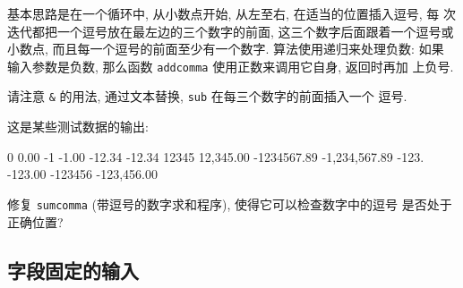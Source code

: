基本思路是在一个循环中, 从小数点开始, 从左至右, 在适当的位置插入逗号, 每
次迭代都把一个逗号放在最左边的三个数字的前面, 这三个数字后面跟着一个逗号或
小数点, 而且每一个逗号的前面至少有一个数字. 算法使用递归来处理负数: 如果 
输入参数是负数, 那么函数 \verb'addcomma' 使用正数来调用它自身, 返回时再加
上负号.
请注意 \verb'&' 的用法, 通过文本替换, \verb'sub' 在每三个数字的前面插入一个
逗号.

这是某些测试数据的输出:
\begin{shell}
    0                            0.00
    -1                          -1.00
    -12.34                     -12.34
    12345                   12,345.00
    -1234567.89         -1,234,567.89
    -123.                     -123.00
    -123456               -123,456.00
\end{shell}

\begin{exercise}
    修复 \verb'sumcomma' (带逗号的数字求和程序), 使得它可以检查数字中的逗号
    是否处于正确位置?
\end{exercise}

\subsection{字段固定的输入}
\label{subsec:fixed_field_input}

